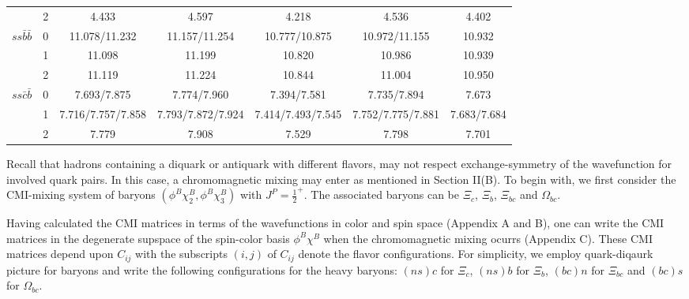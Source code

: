 \documentclass[prt,twocolumn,floatfix,nofootinbib]{revtex4}
\begin{document}
\begin{table}[!htbp]
\begin{tabular}{ccccccc}
                        &2      &4.433                  &4.597                               &4.218                               &4.536                  &4.402 \\
        $ss\bar{b}\bar{b}$
                        &0      &11.078/11.232          &11.157/11.254                       &10.777/10.875                       &10.972/11.155          &10.932 \\
                        &1      &11.098                 &11.199                              &10.820                              &10.986                 &10.939 \\
                        &2      &11.119                 &11.224                              &10.844                              &11.004                 &10.950 \\
        $ss\bar{c}\bar{b}$
                        &0      &7.693/7.875            &7.774/7.960                         &7.394/7.581                         &7.735/7.894            &7.673 \\
                        &1      &7.716/7.757/7.858      &7.793/7.872/7.924                   &7.414/7.493/7.545                   &7.752/7.775/7.881      &7.683/7.684 \\
                        &2      &7.779                  &7.908                               &7.529                               &7.798                  &7.701 \\
        \hline\hline
    \end{tabular}
\end{table}

Recall that hadrons containing a diquark or antiquark with different flavors, may not respect exchange-symmetry of the wavefunction for involved quark pairs. In this case, a chromomagnetic mixing may enter as mentioned in Section II(B). To begin with, we first consider the CMI-mixing system of baryons $(\phi^{B}\chi_{2}^{B},\phi^{B}\chi_{3}^{B})$ with $J^{P}={\frac{1}{2}}^{+}$. The associated baryons can be $\Xi_{c}$, $\Xi_{b}$, $\Xi_{bc}$ and $\Omega_{bc}$.

Having calculated the CMI matrices in terms of the wavefunctions in color and spin space (Appendix A and B), one can write the CMI matrices in the degenerate supspace of the spin-color basis $\phi^{B}\chi^{B}$ when the chromomagnetic mixing ocurrs (Appendix C). These CMI matrices depend upon $C_{ij}$ with the subscripts $(i, j)$ of $C_{ij}$ denote the flavor configurations. For simplicity, we employ quark-diqaurk picture for baryons and write the following configurations for the heavy baryons: $(ns)c$ for $\Xi_{c}$, $(ns)b$ for $\Xi_{b}$, $(bc)n$ for $\Xi_{bc}$ and $(bc)s$ for $\Omega_{bc}$.
\end{document}
